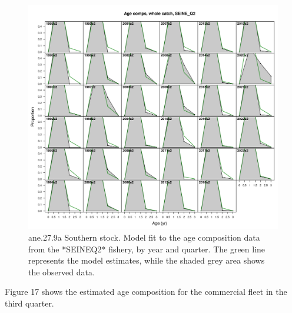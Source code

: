 \documentclass[
]{article}
\begin{document}
\begin{figure}[H]

{\centering \includegraphics[width=0.95\linewidth]{report/run/S1.0_4FLEETS_SelECO_RecIndex_Mnewfix/fig_age_fit_SeineQ2} 

}

\caption{ane.27.9a Southern stock. Model fit to the age composition data from the *SEINEQ2* fishery, by year and quarter. The green line represents the model estimates, while the shaded grey area shows the observed data.}\label{fig:unnamed-chunk-46}
\end{figure}

Figure 17 shows the estimated age composition for the commercial fleet
in the third quarter.
\end{document}
